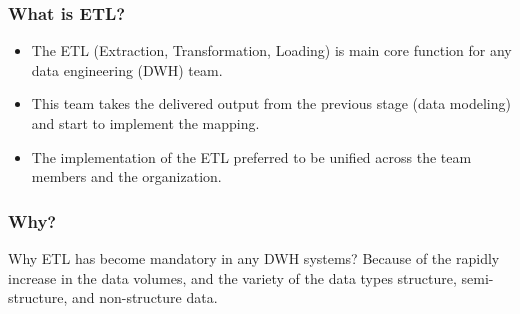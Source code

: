 \begin{frame}
	\frametitle{What is ETL?}

	\begin{itemize}[<+->]
		\item The ETL (Extraction, Transformation, Loading) is main core function for any data engineering (DWH) team.

		\item This team takes the delivered output from the previous stage (data modeling) and start to implement the mapping.

		\item The implementation of the ETL preferred to be unified across the team members and the organization.

	\end{itemize}

\end{frame}
\begin{frame}
	\frametitle{Why?}
	\centering
	\begin{block}{Why ETL has become mandatory in any DWH systems? }
		Because of the rapidly increase in the data volumes,
		and the variety of the data types structure, semi-structure, and non-structure data.
	\end{block}

\end{frame}

